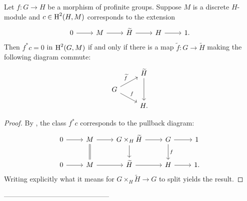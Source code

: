 \documentclass[phd,cornellheadings,draft]{cornell}
\begin{document}
\begin{proposition}
Let $f\colon G\to H$ be a morphism of profinite groups. Suppose $M$ is a 
discrete $H$-module and $c\in \operatorname{H}^2(H,M)$ corresponds to the extension 
\[
\begin{tikzcd}
	0 \ar[r]
		& M \ar[r]
		& \widetilde H \ar[r]
		& H \ar[r] 
		& 1 .
\end{tikzcd}
\]
Then $f^\ast c=0$ in $\operatorname{H}^2(G,M)$ if and only if there is a map 
$\widetilde f\colon G\to \widetilde H$ making the following diagram commute: 
\[
\begin{tikzcd}[row sep=small]
	& \widetilde H \ar[dd] \\
	G \ar[ur, "\widetilde f"] \ar[dr, "f"] \\
	& H .
\end{tikzcd}
\]
\end{proposition}
\begin{proof}
By \cite[6.6.4]{weibel-1994}, the class $f^\ast c$ corresponds to the pullback 
diagram: 
\[
\begin{tikzcd}
	0 \ar[r]
		& M \ar[r] \ar[d, equals]
		& G\times_H \widetilde{H} \ar[r] \ar[d] 
		& G \ar[r] \ar[d, "f"]
		& 1 \\
	0 \ar[r]
		& M \ar[r]
		& \widetilde H \ar[r]
		& H \ar[r] 
		& 1 .
\end{tikzcd}
\]
Writing explicitly what it means for $G\times_H \widetilde H \to G$ to split 
yields the result. 
\end{proof}


---------------------------------------------
\end{document}
